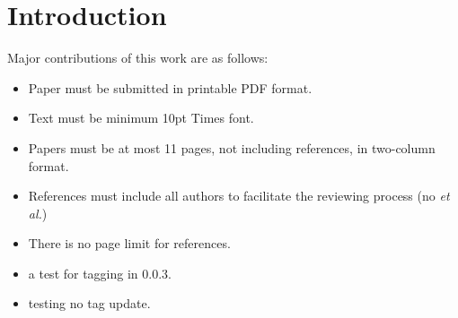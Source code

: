 \section{Introduction}

\vspace{1ex}Major contributions of this work are as follows:

\begin{itemize}
\item Paper must be submitted in printable PDF format.
\item Text must be minimum 10pt Times font.
\item Papers must be at most 11 pages, not including references, in two-column format.
\item References must include all authors to facilitate the reviewing process (no \emph{et al.})
\item There is no page limit for references.
\item a test for tagging in 0.0.3.
\item testing no tag update.
\end{itemize}


